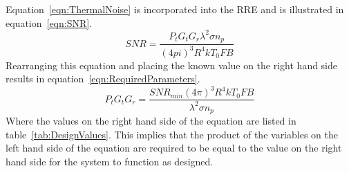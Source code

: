 \documentclass[11pt]{witseiepaper}
\begin{document}
\begin{bibunit}[witseie]
Equation~\ref{eqn:ThermalNoise} is incorporated into the RRE and is illustrated in equation~\ref{eqn:SNR}.
\begin{equation} \label{eqn:SNR}
SNR = \frac{P_{t} G_{t} G_{r} \lambda^2 \sigma n_p}{(4 pi)^3 R^4 k T_0 F B}
\end{equation}
Rearranging this equation and placing the known value on the right hand side results in equation~\ref{eqn:RequiredParameters}.
\begin{equation} \label{eqn:RequiredParameters}
P_{t} G_{t} G_{r} = \frac{SNR_{min} (4 \pi )^3 R^4 k T_{0} F B}{{\lambda}^2 \sigma n_p}
\end{equation}
Where the values on the right hand side of the equation are listed in table~\ref{tab:DesignValues}.
This implies that the product of the variables on the left hand side of the equation are required to be equal to the value on the right hand side for the system to function as designed.


\end{bibunit}
\end{document}
